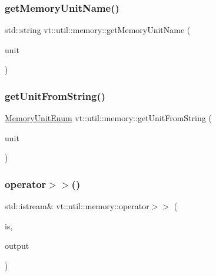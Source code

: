 \mbox{\label{namespacevt_1_1util_1_1memory_a6a1de4e8806e74e6e0ef92e4262b654b}} 
\subsubsection{\texorpdfstring{get\+Memory\+Unit\+Name()}{getMemoryUnitName()}}
{\footnotesize\ttfamily std\+::string vt\+::util\+::memory\+::get\+Memory\+Unit\+Name (\begin{DoxyParamCaption}\item[{\hyperlink{namespacevt_1_1util_1_1memory_a64df3d84293b34009f78e2a1db2f9bb6}{Memory\+Unit\+Enum}}]{unit }\end{DoxyParamCaption})}

\mbox{\label{namespacevt_1_1util_1_1memory_aeceb7d7ac924dd3d88a58eab5ebf64f7}} 
\subsubsection{\texorpdfstring{get\+Unit\+From\+String()}{getUnitFromString()}}
{\footnotesize\ttfamily \hyperlink{namespacevt_1_1util_1_1memory_a64df3d84293b34009f78e2a1db2f9bb6}{Memory\+Unit\+Enum} vt\+::util\+::memory\+::get\+Unit\+From\+String (\begin{DoxyParamCaption}\item[{std\+::string const \&}]{unit }\end{DoxyParamCaption})}

\mbox{\label{namespacevt_1_1util_1_1memory_afe1acbbca9aa1bd7310548cefd40045c}} 
\subsubsection{\texorpdfstring{operator$>$$>$()}{operator>>()}}
{\footnotesize\ttfamily std\+::istream\& vt\+::util\+::memory\+::operator$>$$>$ (\begin{DoxyParamCaption}\item[{std\+::istream \&}]{is,  }\item[{\hyperlink{structvt_1_1util_1_1memory_1_1_comma_delimit}{Comma\+Delimit} \&}]{output }\end{DoxyParamCaption})}



